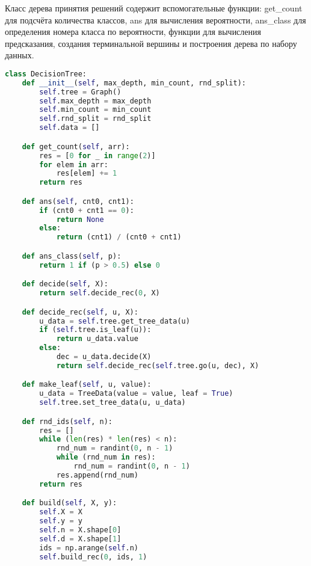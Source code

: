 Класс дерева принятия решений содержит вспомогательные функции: get\_count для подсчёта количества классов, ans для вычисления вероятности, ans\_class для определения номера класса по вероятности, функции для вычисления предсказания, создания терминальной вершины и построения дерева по набору данных.
\begin{lstlisting}[language=Python]
class DecisionTree:
    def __init__(self, max_depth, min_count, rnd_split):
        self.tree = Graph()
        self.max_depth = max_depth
        self.min_count = min_count
        self.rnd_split = rnd_split
        self.data = []

    def get_count(self, arr):
        res = [0 for _ in range(2)]
        for elem in arr:
            res[elem] += 1
        return res

    def ans(self, cnt0, cnt1):
        if (cnt0 + cnt1 == 0):
            return None
        else:
            return (cnt1) / (cnt0 + cnt1)

    def ans_class(self, p):
        return 1 if (p > 0.5) else 0

    def decide(self, X):
        return self.decide_rec(0, X)

    def decide_rec(self, u, X):
        u_data = self.tree.get_tree_data(u)
        if (self.tree.is_leaf(u)):
            return u_data.value
        else:
            dec = u_data.decide(X)
            return self.decide_rec(self.tree.go(u, dec), X)

    def make_leaf(self, u, value):
        u_data = TreeData(value = value, leaf = True)
        self.tree.set_tree_data(u, u_data)

    def rnd_ids(self, n):
        res = []
        while (len(res) * len(res) < n):
            rnd_num = randint(0, n - 1)
            while (rnd_num in res):
                rnd_num = randint(0, n - 1)
            res.append(rnd_num)
        return res

    def build(self, X, y):
        self.X = X
        self.y = y
        self.n = X.shape[0]
        self.d = X.shape[1]
        ids = np.arange(self.n)
        self.build_rec(0, ids, 1)


\end{lstlisting}
